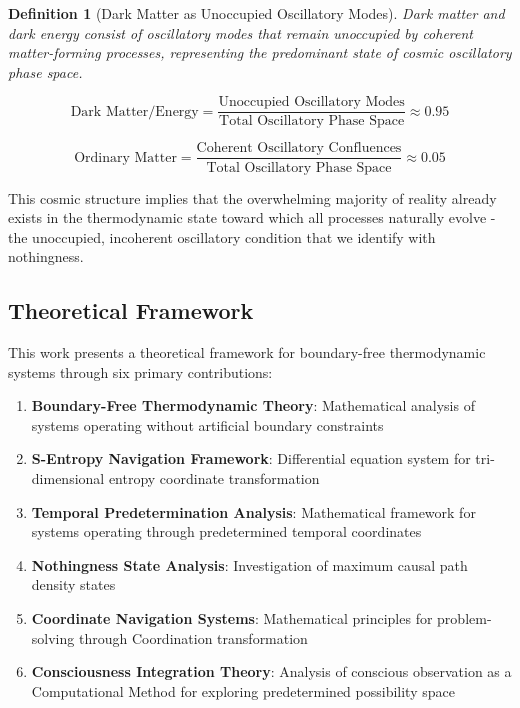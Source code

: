 \documentclass[11pt,a4paper]{article}
\newtheorem{definition}[theorem]{Definition}
\theoremstyle{remark}
\begin{document}
\begin{definition}[Dark Matter as Unoccupied Oscillatory Modes]
Dark matter and dark energy consist of oscillatory modes that remain unoccupied by coherent matter-forming processes, representing the predominant state of cosmic oscillatory phase space.
\end{definition}

\begin{equation}
\text{Dark Matter/Energy} = \frac{\text{Unoccupied Oscillatory Modes}}{\text{Total Oscillatory Phase Space}} \approx 0.95
\label{eq:dark_fraction}
\end{equation}

\begin{equation}
\text{Ordinary Matter} = \frac{\text{Coherent Oscillatory Confluences}}{\text{Total Oscillatory Phase Space}} \approx 0.05
\label{eq:matter_fraction}
\end{equation}

This cosmic structure implies that the overwhelming majority of reality already exists in the thermodynamic state toward which all processes naturally evolve - the unoccupied, incoherent oscillatory condition that we identify with nothingness.

\subsection{Theoretical Framework}

This work presents a theoretical framework for boundary-free thermodynamic systems through six primary contributions:

\begin{enumerate}
\item \textbf{Boundary-Free Thermodynamic Theory}: Mathematical analysis of systems operating without artificial boundary constraints
\item \textbf{S-Entropy Navigation Framework}: Differential equation system for tri-dimensional entropy coordinate transformation
\item \textbf{Temporal Predetermination Analysis}: Mathematical framework for systems operating through predetermined temporal coordinates
\item \textbf{Nothingness State Analysis}: Investigation of maximum causal path density states
\item \textbf{Coordinate Navigation Systems}: Mathematical principles for problem-solving through Coordination transformation
\item \textbf{Consciousness Integration Theory}: Analysis of conscious observation as a Computational Method for exploring predetermined possibility space
\end{enumerate}
\end{document}
